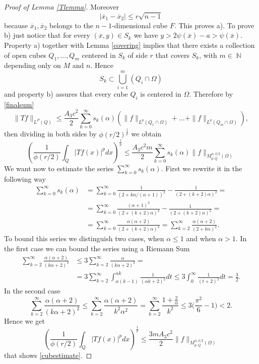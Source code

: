 \documentclass[12pt]{article}
\theoremstyle{definition}
\DeclareMathOperator\nn{\mathbb{N}}
\begin{document}
\begin{proof}[Proof of Lemma \ref{Tlemma}]
Moreover 
\[ |\overline x_1 - \overline x_2|\le r \sqrt {n-1}\]
because $\overline x_1,\overline x_2 $ belongs to the $n-1$-dimensional cube $F.$ This proves a). To prove b) just notice that for every $(\overline x, y ) \in S_k$ we have $y>2\psi(\overline x)-a>\psi(\overline x)$.
Property a) together with Lemma \ref{covering} implies that there exists a collection of open cubes $Q_1,...,Q_m$ centered in $S_k$ of side $r$ that covers $S_k$, with $m \in \nn$ depending only on $M$ and $n$. Hence
\[ S_k \subset \bigcup_{i=1}^m (Q_i\cap \Omega) \]
and property b) assures that every cube $Q_i$ is centered in $\Omega.$ Therefore by \eqref{finalsum} 
\[ \| Tf\|_{L^P(Q)} \le \frac{A_3c^2}{2}\sum_{k=0}^\infty s_k(\alpha) (\|f\|_{L^p(Q_1\cap \Omega)}+...+\|f\|_{L^p(Q_m\cap \Omega)}),\]
 then dividing in both sides by $\phi(r/2)^{\frac{1}{p}}$ we obtain
\[\left(\frac{1}{\phi(r/2)}\int_Q|Tf(x)|^p dx\right)^{\frac{1}{p}} \le \frac{A_3c^2m}{2} \sum_{k=0}^\infty s_k(\alpha) \| f\|_{M^{\phi,\delta/2}_{p,Q}(\Omega)} \]
We want now to estimate the series $\sum_{k=0}^\infty s_k(\alpha)$. First we rewrite it in the following way
\begin{align*}
\sum_{k=0}^\infty s_k(\alpha)&=\sum_{k=0}^\infty \frac{1}{(2+k\alpha/(\alpha+1))^2} -\frac{1}{(2+(k+2)\alpha)^2}=\\
&=\sum_{k=0}^\infty \frac{(\alpha+1)^2}{(2+(k+2)\alpha)^2} -\frac{1}{(2+(k+2)\alpha)^2}=\\
&=\sum_{k=0}^\infty \frac{\alpha(\alpha+2)}{(2+(k+2)\alpha)^2}= \sum_{k=2}^\infty \frac{\alpha(\alpha+2)}{(2+k\alpha)^2}.
\end{align*}
To bound this series we distinguish two cases, when $\alpha\le 1$ and when $\alpha>1$. In the first case we can bound the series using a Riemann Sum
\begin{align*}
\sum_{k=2}^\infty \frac{\alpha(\alpha+2)}{(k\alpha+2)^2} &\le 3\sum_{k=2}^\infty \frac{\alpha}{(k\alpha+2)^2}=\\
&=3\sum_{k=2}^\infty \int_{\alpha (k-1)}^{\alpha k} \frac{1}{(\alpha k+2)^2}dt \le 3\int_0^\infty \frac{1}{(t+2)^2}dt=\frac{3}{2}. 
\end{align*}
In the second case
\[  \sum_{k=2}^\infty \frac{\alpha(\alpha+2)}{(k\alpha+2)^2}  \le \sum_{k=2}^\infty \frac{\alpha(\alpha+2)}{k^2\alpha^2}=\sum_{k=2}^\infty \frac{1+\frac{2}{\alpha}}{k^2} \le 3 \bigl(\frac{\pi^2}{6}-1\bigr)<2.\]
Hence we get 
\[\left(\frac{1}{\phi(r/2)}\int_Q|Tf(x)|^p dx\right)^{\frac{1}{p}} \le \frac{3mA_3c^2}{2} \| f\|_{M_{p,Q}^{\phi,\delta/2}(\Omega)} \]
that shows \eqref{cubestimate}. 


\end{proof}
\end{document}
